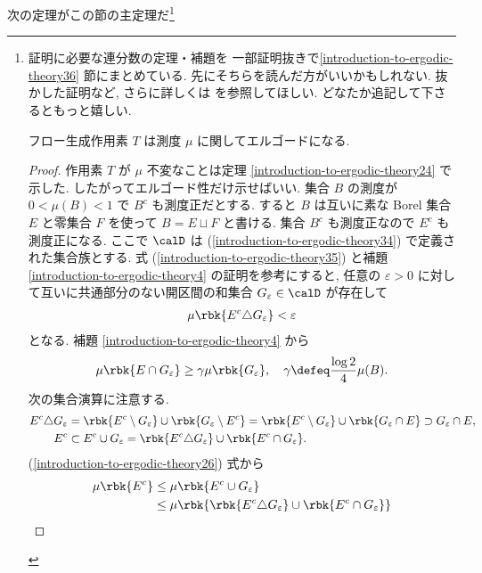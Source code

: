 \documentclass[openany, a4paper, oneside]{jsbook}
\begin{document}
次の定理がこの節の主定理だ\footnote{証明に必要な連分数の定理・補題を
一部証明抜きで\ref{introduction-to-ergodic-theory36} 節にまとめている.
先にそちらを読んだ方がいいかもしれない.
抜かした証明など, さらに詳しくは \cite[Chapter7-8]{JornSteuding1} を参照してほしい.
どなたか追記して下さるともっと嬉しい.

\begin{thm}
フロー生成作用素 $T$ は測度 $\mu$ に関してエルゴードになる.
\end{thm}
\begin{proof}
作用素 $T$ が $\mu$ 不変なことは定理 \ref{introduction-to-ergodic-theory24} で示した.
したがってエルゴード性だけ示せばいい.
集合 $B$ の測度が $0 < \mu(B) < 1$ で $B^{c}$ も測度正だとする.
すると $B$ は互いに素な Borel 集合 $E$ と零集合 $F$ を使って $B = E \sqcup F$ と書ける.
集合 $B^c$ も測度正なので $E^c$ も測度正になる.
ここで $\calD$ は (\ref{introduction-to-ergodic-theory34}) で定義された集合族とする.
式 (\ref{introduction-to-ergodic-theory35}) と補題 \ref{introduction-to-ergodic-theory4} の証明を参考にすると,
任意の $\varepsilon > 0$ に対して互いに共通部分のない開区間の和集合 $G_{\varepsilon} \in \calD$ が存在して
\begin{align}
 \mu \rbk{E^c \triangle G_{\varepsilon}}
 <
 \varepsilon
\end{align}
となる.
補題 \ref{introduction-to-ergodic-theory4} から
\begin{align}
 \mu \rbk{E \cap G_{\varepsilon}}
 \geq
 \gamma \mu \rbk{G_{\varepsilon}}, \quad \gamma \defeq \frac{\log 2}{4} \mu (B).
\end{align}
次の集合演算に注意する.
\begin{align}
 E^{c} \triangle G_{\varepsilon}
 &=
 \rbk{E^{c} \setminus G_{\varepsilon}} \cup \rbk{G_{\varepsilon} \setminus E^{c}}
 =
 \rbk{E^{c} \setminus G_{\varepsilon}} \cup \rbk{G_{\varepsilon} \cap E}
 \supset
 G_{\varepsilon} \cap E, \label{introduction-to-ergodic-theory25}\\
 E^{c}
 &\subset
 E^{c} \cup G_{\varepsilon}
 =
 \rbk{E^c \triangle G_{\varepsilon}} \cup \rbk{E^c \cap G_{\varepsilon}}. \label{introduction-to-ergodic-theory26}
\end{align}
(\ref{introduction-to-ergodic-theory26}) 式から
\begin{align}
 \mu \rbk{E^c}
 &\leq
 \mu \rbk{E^c \cup G_{\varepsilon}} \\
 &\leq
 \mu \rbk{\rbk{E^c \triangle G_{\varepsilon}} \cup \rbk{E^c \cap G_{\varepsilon}}} \\

\end{align}
\end{proof}}
\end{document}
